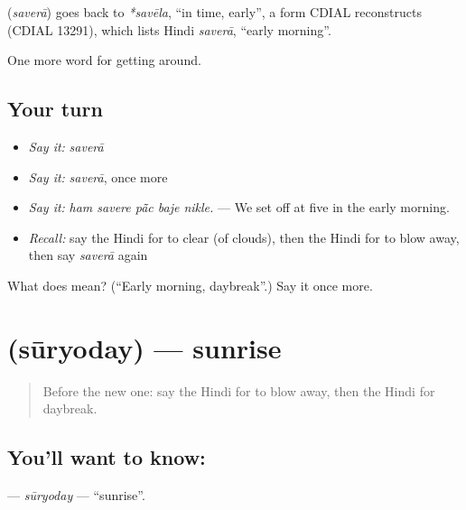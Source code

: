 \begin{cousinweb}
\textbf{} (\emph{saverā}) goes back to \emph{*savēla}, \textquotedblleft{}in time, early\textquotedblright{}, a form CDIAL reconstructs (CDIAL 13291), which lists Hindi \emph{saverā}, \textquotedblleft{}early morning\textquotedblright{}.
\end{cousinweb}

\begin{grammarlens}[title={What you've built}]
One more word for getting around.
\end{grammarlens}

\subsection*{Your turn}
\begin{itemize}
\raggedright
  \item \emph{Say it:} \emph{saverā}
  \item \emph{Say it:} \emph{saverā}, once more
  \item \emph{Say it:} \emph{ham savere pā̃c baje nikle.} — We set off at five in the early morning.
  \item \emph{Recall:} say the Hindi for to clear (of clouds), then the Hindi for to blow away, then say \emph{saverā} again
\end{itemize}

\begin{tcolorbox}[breakable,colback=teal!4,colframe=teal!35!black,title={Before you move on}]
What does  mean? (\textquotedblleft{}Early morning, daybreak\textquotedblright{}.) Say it once more.
\end{tcolorbox}
\section[\texorpdfstring{\hi{सूर्योदय} (sūryoday)}{सूर्योदय (sūryoday)}]{ (sūryoday) — sunrise}

\label{lesson:HI-C441-suryoday}



\begin{quote}
Before the new one: say the Hindi for to blow away, then the Hindi for daybreak.
\end{quote}

\subsection*{You'll want to know: }
\textbf{} — \emph{sūryoday} — \textquotedblleft{}sunrise\textquotedblright{}.

